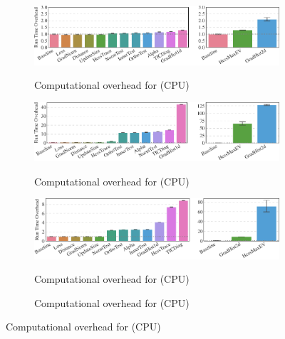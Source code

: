 \captionsetup[subfigure]{justification=justified,singlelinecheck=false}

\begin{figure}[p]
  \vfill
  \begin{subfigure}[t]{\linewidth}
    \caption{Computational overhead for \mnist \MNISTNET (CPU)}
    \includegraphics{../repos/cockpit-paper/fig/01_benchmark/output/fig_individual/benchmark_combined_mnist_logreg_cpu_thesis-wide}
    \label{cockpit::fig:app_benchmark_instruments_cpu-mnist_logreg}
  \end{subfigure}
  \vfill
  \begin{subfigure}[t]{\linewidth}
    \caption{Computational overhead for \mnist \mlp (CPU)}
    \includegraphics{../repos/cockpit-paper/fig/01_benchmark/output/fig_individual/benchmark_combined_mnist_mlp_cpu_thesis-wide}
    \label{cockpit::fig:app_benchmark_instruments_cpu-mnist_mlp}
  \end{subfigure}
  \vfill
  \begin{subfigure}[t]{\linewidth}
    \caption{Computational overhead for \cifarten \threecthreed (CPU)}
    \includegraphics{../repos/cockpit-paper/fig/01_benchmark/output/fig_individual/benchmark_combined_cifar10_3c3d_cpu_thesis-wide}
    \label{cockpit::fig:app_benchmark_instruments_cpu-cifar10}
  \end{subfigure}
  \vfill
  \begin{subfigure}[t]{\linewidth}
    \caption{Computational overhead for \fmnist \twoctwod (CPU)}

\end{subfigure}
\end{figure}
